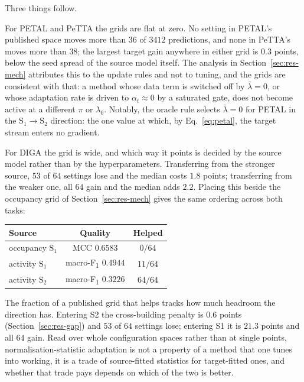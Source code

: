 \documentclass[a4paper,fleqn]{cas-dc}
\newcommand{\macf}{macro-F\textsubscript{1}}
\begin{document}
Three things follow.

For PETAL and PeTTA the grids are flat at zero. No setting in PETAL's published space
moves more than $36$ of $3412$ predictions, and none in PeTTA's moves more than $38$; the
largest target gain anywhere in either grid is $0.3$ points, below the seed spread of the
source model itself. The analysis in Section~\ref{sec:res-mech} attributes this to the
update rules and not to tuning, and the grids are consistent with that: a method whose
data term is switched off by $\bar\lambda=0$, or whose adaptation rate is driven to
$\alpha_t\approx0$ by a saturated gate, does not become active at a different $\pi$ or
$\lambda_0$. Notably, the oracle rule selects $\bar\lambda=0$ for PETAL in the
$\text{S}_1\!\to\!\text{S}_2$ direction: the one value at which, by
Eq.~\ref{eq:petal}, the target stream enters no gradient.

For DIGA the grid is wide, and which way it points is decided by the source model rather
than by the hyperparameters. Transferring from the stronger source, $53$ of $64$ settings
lose and the median costs $1.8$ points; transferring from the weaker one, all $64$ gain
and the median adds $2.2$. Placing this beside the occupancy grid of
Section~\ref{sec:res-mech} gives the same ordering across both tasks:

\begin{center}\footnotesize
\begin{tabular}{@{}lcc@{}}
\toprule
Source & Quality & Helped \\
\midrule
occupancy $\text{S}_1$ & MCC $0.6583$ & $0/64$ \\
activity $\text{S}_1$  & \macf{} $0.4944$ & $11/64$ \\
activity $\text{S}_2$  & \macf{} $0.3226$ & $64/64$ \\
\bottomrule
\end{tabular}
\end{center}

The fraction of a published grid that helps tracks how much headroom the direction has.
Entering S2 the cross-building penalty is $0.6$ points (Section~\ref{sec:res-gap}) and
$53$ of $64$ settings lose; entering S1 it is $21.3$ points and all $64$ gain. Read over
whole configuration spaces rather than at single points, normalisation-statistic
adaptation is
not a property of a method that one tunes into working, it is a trade of source-fitted
statistics for target-fitted ones, and whether that trade pays depends on which of the two
is better.
\end{document}
